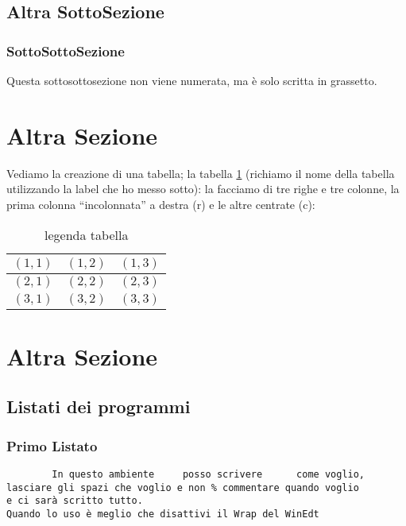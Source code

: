 \documentclass[12pt,a4paper,openright,twoside]{report}
\begin{document}
\subsection{Altra SottoSezione}
\subsubsection{SottoSottoSezione}Questa sottosottosezione non viene
numerata, ma \`e solo scritta in grassetto.
\section{Altra Sezione}
Vediamo la creazione di una tabella; la tabella \ref{tab:uno}
(richiamo il nome della tabella utilizzando la label che ho messo sotto):
la facciamo di tre righe e tre colonne, la prima colonna
``incolonnata'' a destra (r) e le altre centrate (c):\\
\begin{table}[h]

\begin{center}
\begin{tabular}{r|c|c}

\hline \hline
$(1,1)$ & $(1,2)$ & $(1,3)$\\
\hline
$(2,1)$ & $(2,2)$ & $(2,3)$\\
\hline
$(3,1)$ & $(3,2)$ & $(3,3)$\\
\hline \hline
\end{tabular}
\caption[legenda elenco tabelle]{legenda tabella}\label{tab:uno}
\end{center}
\end{table}
\section{Altra Sezione}\label{sec:prova}

\subsection{Listati dei programmi}
\subsubsection{Primo Listato}
\begin{verbatim}
        In questo ambiente     posso scrivere      come voglio,
lasciare gli spazi che voglio e non % commentare quando voglio
e ci sarà scritto tutto.
Quando lo uso è meglio che disattivi il Wrap del WinEdt
\end{verbatim}
\end{document}
